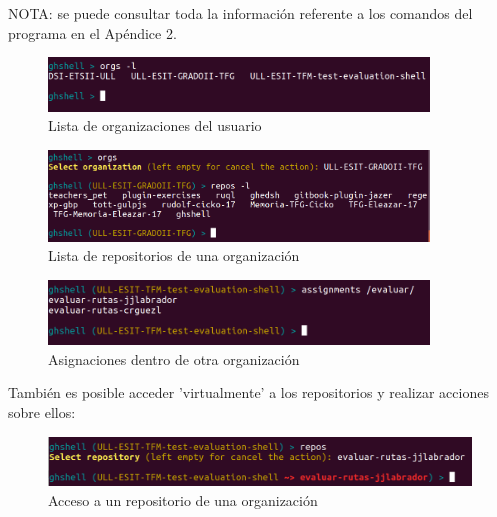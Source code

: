     NOTA: se puede consultar toda la información referente a los comandos del programa en el Apéndice 2.
        
        \begin{figure}[H]
		\begin{center}
		\includegraphics[width=0.9\textwidth]{images/ghshell3}
		\caption{Lista de organizaciones del usuario}
		\label{fig:ghshell3}
		\end{center}
		\end{figure}
		
		\begin{figure}[H]
		\begin{center}
		\includegraphics[width=0.9\textwidth]{images/ghshell4}
		\caption{Lista de repositorios de una organización}
		\label{fig:ghshell4}
		\end{center}
		\end{figure}
		
		\begin{figure}[H]
		\begin{center}
		\includegraphics[width=0.9\textwidth]{images/ghshell5}
		\caption{Asignaciones dentro de otra organización}
		\label{fig:ghshell5}
		\end{center}
		\end{figure}
		
	También es posible acceder 'virtualmente' a los repositorios y realizar acciones sobre ellos:
	
		\begin{figure}[H]
		\begin{center}
		\includegraphics[width=1\textwidth]{images/ghshell5-1}
		\caption{Acceso a un repositorio de una organización}
		\label{fig:ghshell5-1}
		\end{center}
		\end{figure}

